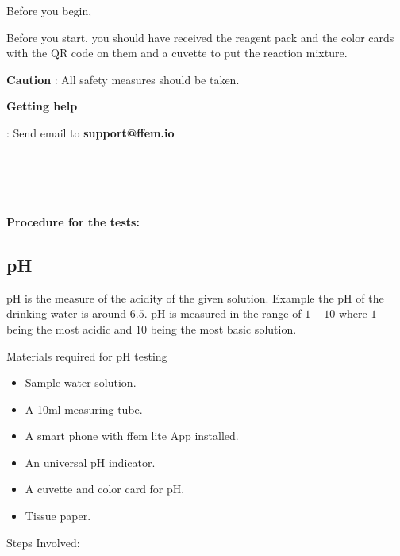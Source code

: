 \documentclass{article}
\begin{document}
    
    \begin{Large}
    Before you begin,
    \end{Large}
    
 Before you start, you should have received the reagent pack and the color cards with the QR code on them and a cuvette to put the reaction mixture.
   
    \textbf{Caution} :  All safety measures should be taken. 


    \begin{large}
    \textbf{Getting help}
    \end{large}
: Send email to \textbf{support@ffem.io} 
\\
\\
\\
\\
\\
\begin{large}
\textbf{Procedure for the tests:}
\end{large}

  \begin{huge}
  \section{pH}
  \end{huge}
  
    pH is the measure of the acidity of the given solution. Example the pH of the drinking water is around  $6.5$.  pH  is measured in the range of $1-10$ where $1$ being the most acidic and $10$ being the most basic solution.
    
    Materials required for pH testing
    \begin{itemize}
    \item Sample water solution.  
    \item A 10ml measuring tube. 
    \item A smart phone with ffem lite App installed.
    \item An universal pH indicator.
    \item A cuvette and color card for pH.
    \item Tissue paper.
\end{itemize}   

\begin{Large}
Steps Involved:
\end{Large}
  
\end{document}
